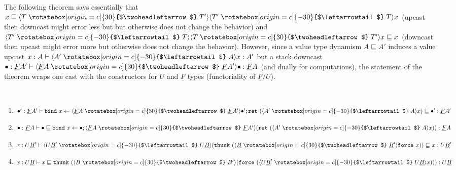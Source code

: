 \documentclass[acmsmall,nonacm]{acmart}
\renewcommand{\u}{\underline}
\newcommand{\ltdyn}{\sqsubseteq}
\newcommand{\uarrow}{\mathrel{\rotatebox[origin=c]{-30}{$\leftarrowtail$}}}
\newcommand{\darrow}{\mathrel{\rotatebox[origin=c]{30}{$\twoheadleftarrow$}}}
\newcommand{\upcast}[2]{\langle{#2}\uarrow{#1}\rangle}
\newcommand{\dncast}[2]{\langle{#1}\darrow{#2}\rangle}
\newcommand{\bindXtoYinZ}[2]{\kw{bind}#2 \leftarrow #1;}
\newcommand{\kw}[1]{\texttt{#1}\,\,}
\newcommand{\ret}{\kw{ret}}
\newcommand{\thunk}{\kw{thunk}}
\newcommand{\force}{\kw{force}}
\begin{document}
 The following theorem says essentially that $x \ltdyn
 \dncast{T}{T'}{\upcast{T}{T'}{x}}$ (upcast then downcast might error
 less but but otherwise does not change the behavior) and
 $\upcast{T}{T'}{\dncast{T}{T'}{x}} \ltdyn x$ (downcast then upcast
 might error more but otherwise does not change the behavior).  However,
 since a value type dynamism $A \ltdyn A'$ induces a value upcast $x :
 A \vdash \upcast{A}{A'}{x} : A'$ but a stack downcast $\bullet : \u F
 A' \vdash \dncast{\u F A}{\u F A'}{\bullet} : \u F A$ (and dually for
 computations), the statement of the theorem wraps one cast with 
 the constructors for $U$ and $\u F$ types (functoriality of $\u F/U$).
\begin{theorem} \label{thm:cast-adjunction} ~~~
  \begin{enumerate}
  \item $\bullet' : \u F A' \vdash \bindXtoYinZ{\dncast{\u F A}{\u F A'}{\bullet'}}{x}{\ret{(\upcast{A}{A'}{x})}} \ltdyn \bullet' : \u F A'$
  \item $\bullet : \u F A \vdash \bullet \ltdyn \bindXtoYinZ{\bullet}{x}{\dncast{\u F A}{\u F A'}{(\ret{(\upcast{A}{A'}{x})})}}  : \u F A$
  \item $x : U \u B' \vdash {\upcast{U \u B}{U \u B'}{(\thunk{({\dncast{\u B}{\u B'}{\force x}})})}} \ltdyn x : U \u B'$
  \item $x : U \u B \vdash x \ltdyn \thunk{(\dncast{B}{B'}{(\force{(\upcast{U \u B}{U \u B'}{x})})})} : U \u B$
  \end{enumerate}
\end{theorem}
\end{document}
